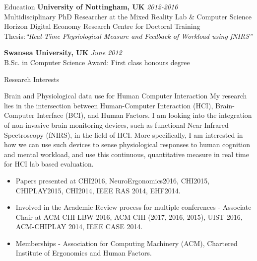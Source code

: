 \documentclass{resume} %
\begin{document}

\begin{rSection}{Education}
{\bf University of Nottingham, UK} \hfill {\em 2012-2016} \\
Multidisciplinary PhD Researcher at the Mixed Reality Lab \& Computer Science \\
Horizon Digital Economy Research Centre for Doctoral Training \\
Thesis:\emph{``Real-Time Physiological Measure and Feedback of Workload using fNIRS''} \smallskip \\
\vspace{-3 mm}

{\bf Swansea University, UK} \hfill {\em June 2012} \\
B.Sc. in Computer Science \hfill Award: First class honours degree

\end{rSection}

\begin{rSection}{Research Interests}
\begin{rSubsection}{Brain and Physiological data use for Human Computer Interaction}{ }{ }{ }
\vspace{-5 mm}
My research lies in the intersection between Human-Computer Interaction (HCI), Brain-Computer
Interface (BCI), and Human Factors. I am looking into the integration of non-invasive
brain monitoring devices, such as functional Near Infrared Spectroscopy (fNIRS), in the field of HCI.
More specifically, I am interested in how we can use such devices to sense physiological responses to
human cognition and mental workload, and use this continuous, quantitative measure in real time for HCI lab based evaluation.

\begin{itemize}
  \item Papers presented at CHI2016, NeuroErgonomics2016, CHI2015, CHIPLAY2015, CHI2014, IEEE RAS 2014, EHF2014.
  \item Involved in the Academic Review process for multiple conferences - Associate Chair at ACM-CHI LBW 2016, ACM-CHI (2017, 2016, 2015), UIST 2016, ACM-CHIPLAY 2014, IEEE CASE 2014.
  \item  Memberships - Association for Computing Machinery (ACM), Chartered Institute of Ergonomics and Human Factors.
\end{itemize}

\end{rSubsection}

\end{rSection}
\end{document}
